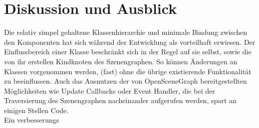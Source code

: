 \documentclass{llncs}
\begin{document}
\section{Diskussion und Ausblick}
Die relativ simpel gehaltene Klassenhierarchie und minimale Bindung zwischen den Komponenten hat sich w\"ahrend der Entwicklung als
vorteilhaft erwiesen. Der Einflussbereich einer Klasse beschr\"ankt sich in der Regel auf sie selbst, sowie die von ihr erstellen
Kindknoten des Szenengraphen. So k\"onnen \"Anderungen an Klassen vorgenommen werden, (fast) ohne die \"ubrige existierende Funktionalit\"at
zu beeinflussen. Auch das Ausnutzen der von OpenSceneGraph bereitgestellten M\"oglichkeiten wie Update Callbacks oder Event Handler, die
bei der Traversierung des Szenengraphen nacheinander aufgerufen werden, spart an einigen Stellen Code.\\
Ein verbesserungs
\end{document}
